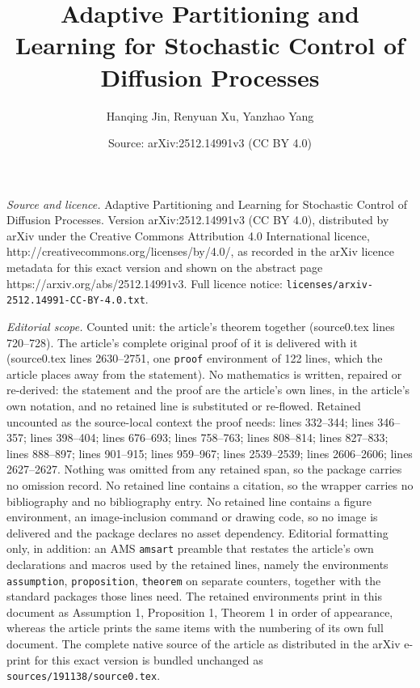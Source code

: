 \documentclass[10pt,a4paper]{amsart}
\title{Adaptive Partitioning and Learning for Stochastic Control of Diffusion Processes}
\author{Hanqing Jin, Renyuan Xu, Yanzhao Yang}
\date{Source: arXiv:2512.14991v3 (CC BY 4.0)}
\begin{document}
\maketitle

\noindent\emph{Source and licence.} Adaptive Partitioning and Learning for Stochastic Control of Diffusion Processes. Version arXiv:2512.14991v3 (CC BY 4.0), distributed by arXiv under the Creative Commons Attribution 4.0 International licence, http://creativecommons.org/licenses/by/4.0/, as recorded in the arXiv licence metadata for this exact version and shown on the abstract page https://arxiv.org/abs/2512.14991v3. Full licence notice: \texttt{licenses/arxiv-2512.14991-CC-BY-4.0.txt}.\par\smallskip

\noindent\textit{Editorial scope.} Counted unit: the article's theorem together (source0.tex lines 720--728). The article's complete original proof of it is delivered with it (source0.tex lines 2630--2751, one \texttt{proof} environment of 122 lines, which the article places away from the statement). No mathematics is written, repaired or re-derived: the statement and the proof are the article's own lines, in the article's own notation, and no retained line is substituted or re-flowed.  Retained uncounted as the source-local context the proof needs: lines 332--344; lines 346--357; lines 398--404; lines 676--693; lines 758--763; lines 808--814; lines 827--833; lines 888--897; lines 901--915; lines 959--967; lines 2539--2539; lines 2606--2606; lines 2627--2627.  Nothing was omitted from any retained span, so the package carries no omission record.  No retained line contains a citation, so the wrapper carries no bibliography and no bibliography entry.  No retained line contains a figure environment, an image-inclusion command or drawing code, so no image is delivered and the package declares no asset dependency.  Editorial formatting only, in addition: an AMS \texttt{amsart} preamble that restates the article's own declarations and macros used by the retained lines, namely the environments \texttt{assumption}, \texttt{proposition}, \texttt{theorem} on separate counters, together with the standard packages those lines need.  The retained environments print in this document as Assumption 1, Proposition 1, Theorem 1 in order of appearance, whereas the article prints the same items with the numbering of its own full document.  The complete native source of the article as distributed in the arXiv e-print for this exact version is bundled unchanged as \texttt{sources/191138/source0.tex}.
\end{document}
